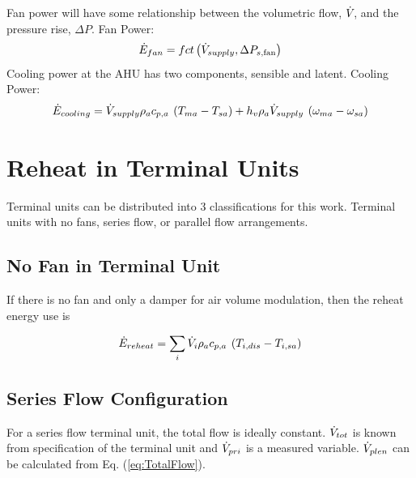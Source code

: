 Fan power will have some relationship between the volumetric flow, \(\dot{V}_{}\), and the
pressure rise, \(\Delta P\). 
Fan Power:
\begin{equation} \label{eq:FanEqnergy}
\dot E_{fan} = fct\left( {\dot{V}_{supply},\Delta {P_{s,{\rm{fan}}}}} \right)
\end{equation}
Cooling power at the AHU has two components, sensible and latent. 
Cooling Power:
\begin{equation} \label{eq:CoolingEnergy}
    {\dot E_{cooling}} = {\dot{V}_{supply}}\rho_a c_{p,a}\:\left( {{T_{ma}} - {T_{sa}}} \right) + h_v\rho_a{\dot{V}_{supply}}\:\left( {{\omega _{ma}} - {\omega _{sa}}} \right)
\end{equation}

\section{Reheat in Terminal Units}

Terminal units can be distributed into 3 classifications for this work.
Terminal units with no fans, series flow, or parallel flow arrangements.

\subsection{No Fan in Terminal Unit}

If there is no fan and only a damper for air volume modulation, then the reheat
energy use is

\begin{equation} \label{eq:ReheatEnergy}
    {\dot E_{reheat}} = \sum\limits_i {{\dot{V}_{i}}\rho_a c_{p,a}\:\left( {{T_{i,dis}} - {T_{i,sa}}} \right)}
\end{equation}

\subsection{Series Flow Configuration}

For a series flow terminal unit, the total flow is ideally constant.
\(\dot{V}_{tot}\) is known from specification of the terminal unit and
\(\dot{V}_{pri}\) is a measured variable. \(\dot{V}_{plen}\) can be calculated from
Eq. (\ref{eq:TotalFlow}).

